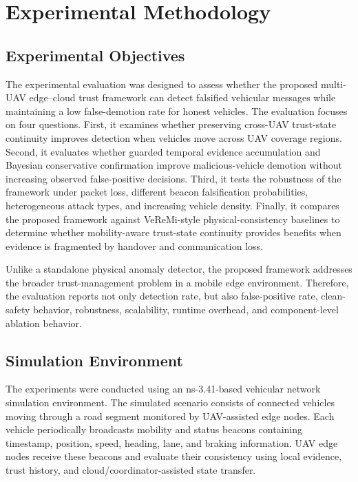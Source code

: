 \documentclass[journal]{IEEEtran}
\begin{document}
\section{Experimental Methodology}
\label{sec:experimental_methodology}

\subsection{Experimental Objectives}
\label{subsec:experimental_objectives}

The experimental evaluation was designed to assess whether the proposed multi-UAV edge--cloud trust framework can detect falsified vehicular messages while maintaining a low false-demotion rate for honest vehicles. The evaluation focuses on four questions. First, it examines whether preserving cross-UAV trust-state continuity improves detection when vehicles move across UAV coverage regions. Second, it evaluates whether guarded temporal evidence accumulation and Bayesian conservative confirmation improve malicious-vehicle demotion without increasing observed false-positive decisions. Third, it tests the robustness of the framework under packet loss, different beacon falsification probabilities, heterogeneous attack types, and increasing vehicle density. Finally, it compares the proposed framework against VeReMi-style physical-consistency baselines to determine whether mobility-aware trust-state continuity provides benefits when evidence is fragmented by handover and communication loss.

Unlike a standalone physical anomaly detector, the proposed framework addresses the broader trust-management problem in a mobile edge environment. Therefore, the evaluation reports not only detection rate, but also false-positive rate, clean-safety behavior, robustness, scalability, runtime overhead, and component-level ablation behavior.

\subsection{Simulation Environment}
\label{subsec:simulation_environment}

The experiments were conducted using an ns-3.41-based vehicular network simulation environment. The simulated scenario consists of connected vehicles moving through a road segment monitored by UAV-assisted edge nodes. Each vehicle periodically broadcasts mobility and status beacons containing timestamp, position, speed, heading, lane, and braking information. UAV edge nodes receive these beacons and evaluate their consistency using local evidence, trust history, and cloud/coordinator-assisted state transfer.
\end{document}
